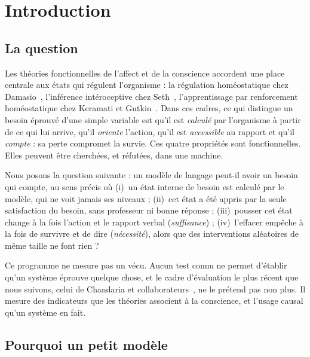 \documentclass[11pt,a4paper]{article}
\begin{document}
\section{Introduction}
\label{sec-intro}

\subsection{La question}

Les théories fonctionnelles de l'affect et de la conscience accordent une place
centrale aux états qui régulent l'organisme : la régulation homéostatique chez
Damasio~\cite{damasio1999,damasio2010}, l'inférence intéroceptive chez
Seth~\cite{seth2013}, l'apprentissage par renforcement homéostatique chez Keramati
et Gutkin~\cite{keramati2014}. Dans ces cadres, ce qui distingue un besoin
\og éprouvé \fg{} d'une simple variable est qu'il est \emph{calculé} par
l'organisme à partir de ce qui lui arrive, qu'il \emph{oriente} l'action, qu'il est
\emph{accessible} au rapport et qu'il \emph{compte} : sa perte compromet la
survie. Ces quatre propriétés sont fonctionnelles. Elles peuvent être cherchées,
et réfutées, dans une machine.

Nous posons la question suivante : un modèle de langage peut-il avoir un besoin
qui compte, au sens précis où (i)~un état interne de besoin est calculé par le
modèle, qui ne voit jamais ses niveaux ; (ii)~cet état a été appris par la
seule satisfaction du besoin, sans professeur ni bonne réponse ; (iii)~pousser cet
état change à la fois l'action et le rapport verbal (\emph{suffisance}) ;
(iv)~l'effacer empêche à la fois de survivre et de dire (\emph{nécessité}),
alors que des interventions aléatoires de même taille ne font rien ?

Ce programme ne mesure pas un vécu. Aucun test connu ne permet d'établir qu'un
système éprouve quelque chose, et le cadre d'évaluation le plus récent que nous
suivons, celui de Chandaria et collaborateurs~\cite{chandaria2026}, ne le
prétend pas non plus. Il mesure des indicateurs que les théories associent à la
conscience, et l'usage causal qu'un système en fait.

\subsection{Pourquoi un petit modèle}
\end{document}
